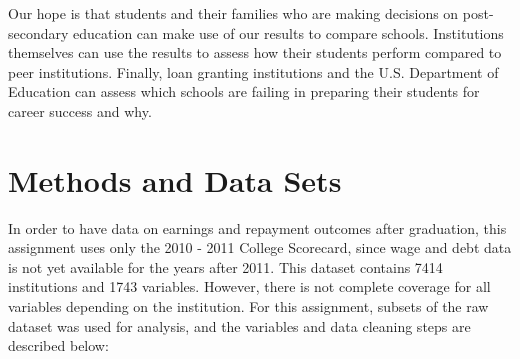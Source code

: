 \documentclass[10pt,twocolumn]{article}
\begin{document}
Our hope is that students and their families who are making decisions on
post-secondary education can make use of our results to compare schools.
Institutions themselves can use the results to assess how their students perform
compared to peer institutions. Finally, loan granting institutions and the U.S.
Department of Education can assess which schools are failing in preparing their
students for career success and why.

\section{Methods and Data Sets}

In order to have data on earnings and repayment outcomes after graduation,
this assignment uses only the 2010 - 2011 College Scorecard, since wage and debt data is not yet
available for the years after 2011. This dataset contains
7414 institutions and 1743 variables. However, there is not complete coverage for
all variables depending on the institution. For this assignment, subsets of the raw
dataset was used for analysis, and the variables and data cleaning steps are
described below:
\end{document}
